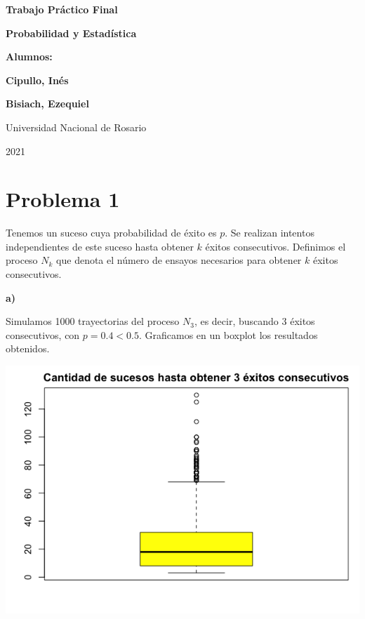 \documentclass[11pt]{article}
\begin{document}
\begin{titlepage}
    \begin{center}
        \vfill
        \vfill
            \vspace{0.7cm}
            \noindent\textbf{\Huge Trabajo Pr\'actico Final}\par
            \noindent\textbf{\Huge Probabilidad y Estad\'istica}\par
            \vspace{.5cm}
        \vfill
        \noindent \textbf{\huge Alumnos:}\par
        \vspace{.5cm}
        \noindent \textbf{\Large Cipullo, In\'es}\par
        \noindent \textbf{\Large Bisiach, Ezequiel}\par

 
        \vfill
        \large Universidad Nacional de Rosario \par
        \noindent\large 2021
    \end{center}
\end{titlepage}
\par


\section*{Problema 1}

Tenemos un suceso cuya probabilidad de éxito es $p$. Se realizan intentos independientes de este suceso hasta obtener $k$ éxitos consecutivos. 
Definimos el proceso $N_k$ que denota el número de ensayos necesarios para obtener $k$ éxitos consecutivos.

\textbf{a)}

Simulamos 1000 trayectorias del proceso $N_3$, es decir, buscando 3 éxitos consecutivos, con $p = 0.4 < 0.5$. Graficamos en un boxplot los resultados obtenidos.

\begin{center}\includegraphics[scale = 0.6]{sucesosEJ1.png}\end{center}
\end{document}
